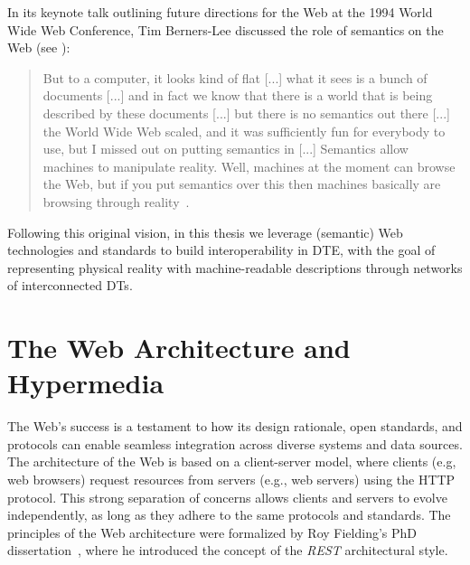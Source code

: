 In its keynote talk outlining future directions for the Web at the 1994 World Wide Web Conference, Tim Berners-Lee discussed the role of semantics on the Web (see ): 

\begin{quote}
But to a computer, it looks kind of flat [...] what it sees is a bunch of documents [...] and in fact we know that there is a world that is being described by these documents [...] but there is no semantics out there [...] the World Wide Web scaled, and it was sufficiently fun for everybody to use, but I missed out on putting semantics in [...] Semantics allow machines to manipulate reality. Well, machines at the moment can browse the Web, but if you put semantics over this then machines basically are browsing through reality~\cite{bernerslee1994keynote}.
\end{quote}

Following this original vision, in this thesis we leverage (semantic) Web technologies and standards to build interoperability in \ac{DTE}, with the goal of representing physical reality with machine-readable descriptions through networks of interconnected \acp{DT}.

\section{The Web Architecture and Hypermedia}


The Web's success is a testament to how its design rationale, open standards, and protocols can enable seamless integration across diverse systems and data sources.
%
The architecture of the Web is based on a client-server model, where clients (e.g, web browsers) request resources from servers (e.g., web servers) using the \ac{HTTP} protocol.
%
This strong separation of concerns allows clients and servers to evolve independently, as long as they adhere to the same protocols and standards.
%
The principles of the Web architecture were formalized by Roy Fielding's PhD dissertation~\cite{fielding2000architectural}, where he introduced the concept of the \emph{\ac{REST}} architectural style.


